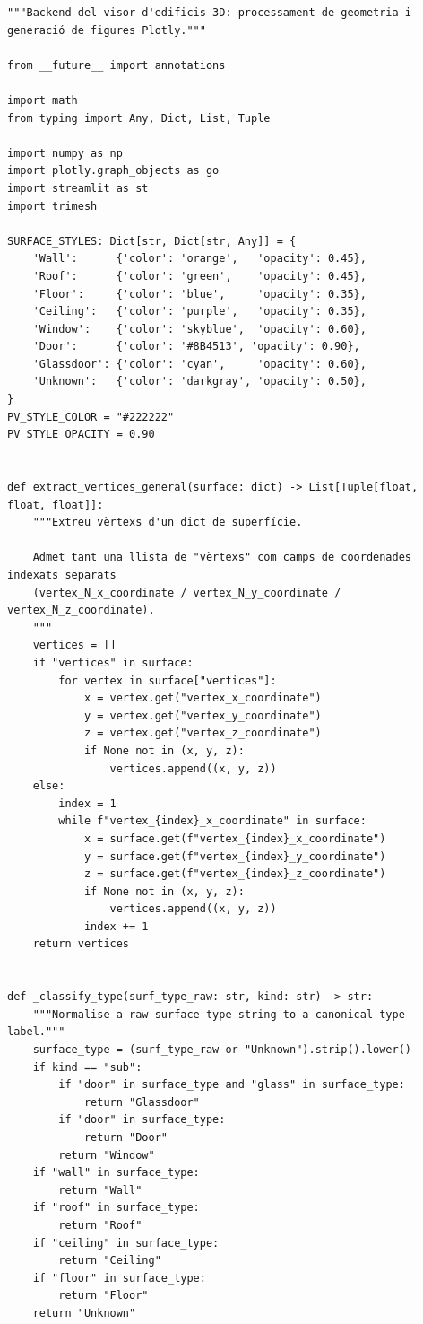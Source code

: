 \documentclass[10pt,a4paper]{article}
\begin{document}
\begin{lstlisting}[style=studioPython,caption={backend/viewer\_3d\_backend.py},label={lst:backend-viewer-3d-backend-py}]
"""Backend del visor d'edificis 3D: processament de geometria i generació de figures Plotly."""

from __future__ import annotations

import math
from typing import Any, Dict, List, Tuple

import numpy as np
import plotly.graph_objects as go
import streamlit as st
import trimesh

SURFACE_STYLES: Dict[str, Dict[str, Any]] = {
    'Wall':      {'color': 'orange',   'opacity': 0.45},
    'Roof':      {'color': 'green',    'opacity': 0.45},
    'Floor':     {'color': 'blue',     'opacity': 0.35},
    'Ceiling':   {'color': 'purple',   'opacity': 0.35},
    'Window':    {'color': 'skyblue',  'opacity': 0.60},
    'Door':      {'color': '#8B4513', 'opacity': 0.90},
    'Glassdoor': {'color': 'cyan',     'opacity': 0.60},
    'Unknown':   {'color': 'darkgray', 'opacity': 0.50},
}
PV_STYLE_COLOR = "#222222"
PV_STYLE_OPACITY = 0.90


def extract_vertices_general(surface: dict) -> List[Tuple[float, float, float]]:
    """Extreu vèrtexs d'un dict de superfície.

    Admet tant una llista de "vèrtexs" com camps de coordenades indexats separats
    (vertex_N_x_coordinate / vertex_N_y_coordinate / vertex_N_z_coordinate).
    """
    vertices = []
    if "vertices" in surface:
        for vertex in surface["vertices"]:
            x = vertex.get("vertex_x_coordinate")
            y = vertex.get("vertex_y_coordinate")
            z = vertex.get("vertex_z_coordinate")
            if None not in (x, y, z):
                vertices.append((x, y, z))
    else:
        index = 1
        while f"vertex_{index}_x_coordinate" in surface:
            x = surface.get(f"vertex_{index}_x_coordinate")
            y = surface.get(f"vertex_{index}_y_coordinate")
            z = surface.get(f"vertex_{index}_z_coordinate")
            if None not in (x, y, z):
                vertices.append((x, y, z))
            index += 1
    return vertices


def _classify_type(surf_type_raw: str, kind: str) -> str:
    """Normalise a raw surface type string to a canonical type label."""
    surface_type = (surf_type_raw or "Unknown").strip().lower()
    if kind == "sub":
        if "door" in surface_type and "glass" in surface_type:
            return "Glassdoor"
        if "door" in surface_type:
            return "Door"
        return "Window"
    if "wall" in surface_type:
        return "Wall"
    if "roof" in surface_type:
        return "Roof"
    if "ceiling" in surface_type:
        return "Ceiling"
    if "floor" in surface_type:
        return "Floor"
    return "Unknown"



\end{lstlisting}
\end{document}
